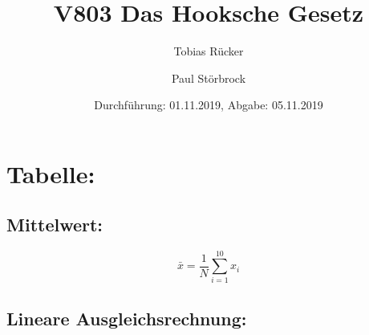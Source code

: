  


\title{V803 Das Hooksche Gesetz}
\author{Tobias Rücker \and Paul Störbrock}
\date{Durchführung: 01.11.2019, Abgabe: 05.11.2019}


\maketitle


\newpage
\section{Tabelle:}   
\begin{table}
    \centering
    \label{tab:data}
       
\end{table}
    \subsection{Mittelwert:}
    \begin{equation}
        \bar{x} = \frac{1}{N}\sum\limits_{i=1}^{10}
            x_i
    \end{equation}

    \subsection{Lineare Ausgleichsrechnung:}

